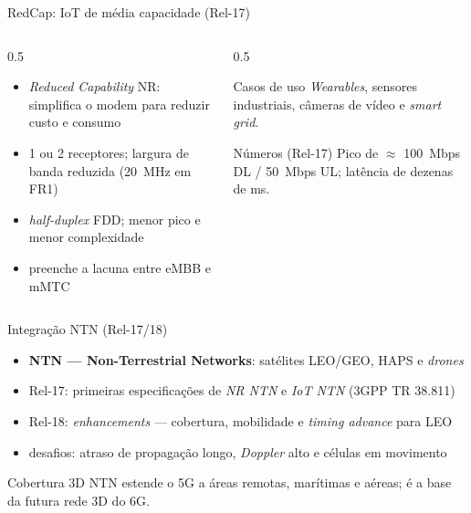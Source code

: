 \documentclass[aspectratio=169,11pt]{beamer}
\begin{document}
\begin{frame}{RedCap: IoT de média capacidade (Rel-17)}
  \begin{columns}
    \begin{column}{0.5\textwidth}
      \begin{itemize}
        \item \emph{Reduced Capability} NR: simplifica o modem para reduzir custo e consumo
        \item 1 ou 2 receptores; largura de banda reduzida (20~MHz em FR1)
        \item \emph{half-duplex} FDD; menor pico e menor complexidade
        \item preenche a lacuna entre eMBB e mMTC
      \end{itemize}
    \end{column}
    \begin{column}{0.5\textwidth}
      \begin{block}{Casos de uso}
        \emph{Wearables}, sensores industriais, câmeras de vídeo e \emph{smart grid}.
      \end{block}
      \begin{exampleblock}{Números (Rel-17)}
        Pico de $\approx$ 100~Mbps DL / 50~Mbps UL; latência de dezenas de ms.
      \end{exampleblock}
    \end{column}
  \end{columns}
\end{frame}

\begin{frame}{Integração NTN (Rel-17/18)}
  \begin{itemize}
    \item \textbf{NTN --- Non-Terrestrial Networks}: satélites LEO/GEO, HAPS e \emph{drones}
    \item Rel-17: primeiras especificações de \emph{NR NTN} e \emph{IoT NTN} (3GPP TR 38.811)
    \item Rel-18: \emph{enhancements} --- cobertura, mobilidade e \emph{timing advance} para LEO
    \item desafios: atraso de propagação longo, \emph{Doppler} alto e células em movimento
  \end{itemize}
  \begin{exampleblock}{Cobertura 3D}
    NTN estende o 5G a áreas remotas, marítimas e aéreas; é a base da futura rede 3D do 6G.
  \end{exampleblock}
\end{frame}
\end{document}
